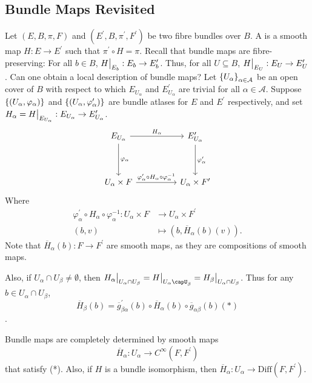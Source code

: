 \documentclass[main.tex]{subfiles}
\begin{document}
\subsection{Bundle Maps Revisited}

Let $(E, B, \pi, F)$ and $(E^\prime, B, \pi^\prime, F^\prime)$ be two fibre bundles over $B$. A  is a smooth map $H : E \to E^\prime$ such that $\pi^\prime \circ H = \pi$. Recall that bundle maps are fibre-preserving: For all $b \in B$, $H\big|_{E_b}: E_b \to E_b^\prime$. Thus, for all $U \subseteq B$, $H \big|_{E_U}: E_U \to E^\prime_U$. Can one obtain a local description of bundle maps? Let $\left\{ U_\alpha\right\}_{\alpha \in \mathcal{A}}$ be an open cover of $B$ with respect to which $E_{U_\alpha}$ and $E^\prime_{U_\alpha}$ are trivial for all $\alpha \in \mathcal{A}$. Suppose $\left\{\left( U_\alpha, \varphi_\alpha \right)\right\}$ and $\left\{\left( U_\alpha, \varphi^\prime_\alpha  \right)\right\}$ are bundle atlases for $E$ and $E^\prime$ respectively, and set $H_\alpha = H\big|_{E_{U_\alpha}} : E_{U_\alpha} \to E^\prime_{U_\alpha}$.
\[
\begin{tikzcd}
E_{U_\alpha} \arrow[rr, "H_\alpha"] \arrow[dd, "\varphi_\alpha"]                              &  & E^\prime_{U_\alpha} \arrow[dd, "\varphi^\prime_\alpha"] \\
                                                                                              &  &                                                         \\
U_\alpha\times F \arrow[rr, "\varphi_\alpha^\prime \circ H_\alpha \circ \varphi_\alpha^{-1}"] &  & U_\alpha\times F^\prime                                       
\end{tikzcd}
\]
Where 
\begin{align*}
    \varphi^\prime_\alpha \circ H_\alpha \circ \varphi_\alpha^{-1} : U_\alpha \times F &\to U_\alpha \times F^\prime \\
    (b, v) &\mapsto (b, \overline{H}_\alpha(b)(v)).
\end{align*}
Note that $\overline{H}_\alpha(b): F \to F^\prime$ are smooth maps, as they are compositions of smooth maps.

Also, if $U_\alpha\cap U_\beta \neq \emptyset$, then $H_\alpha\rst{U_\alpha \cap U_\beta} = H\rst{U_\alpha\capU_\beta} = H_\beta\rst{U_\alpha \cap U_\beta}$. Thus for any $b \in U_\alpha \cap U_\beta$, \[\overline{H}_\beta(b) = \overline{g}^\prime_{\beta\alpha}(b) \circ \overline{H}_\alpha(b) \circ \overline{g}_{\alpha\beta}(b) (*)\].

Bundle maps are completely determined by smooth maps
\[
\overline{H}_\alpha : U_\alpha \to C^\infty(F, F^\prime)
\]
that satisfy (*). Also, if $H$ is a bundle isomorphism, then $\overline{H}_\alpha : U_\alpha \to \text{Diff}(F, F^\prime)$.
\end{document}

